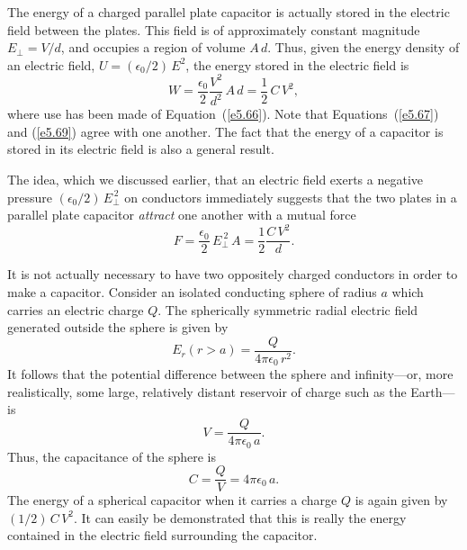 The energy of
a charged parallel
plate
capacitor is actually stored in the electric field between the plates. This field
is of approximately constant magnitude $E_\perp = V/d$, and occupies a
region of volume $A\,d$. Thus, given the energy density of an electric
field, $U = (\epsilon_0/2)\,E^{2}$, the energy stored in the 
electric field is 
\begin{equation}\label{e5.69}
W = \frac{\epsilon_0}{2} \frac{V^2}{d^2}\, A \,d= \frac{1}{2}\, C\, V^2,
\end{equation}
where use has been made of Equation~(\ref{e5.66}). 
Note that Equations~(\ref{e5.67}) and (\ref{e5.69}) agree with one another. The
fact that the energy of a capacitor is stored in its electric field is also
a general result.

The idea, which we discussed earlier, that an electric field exerts a negative
pressure $(\epsilon_0/2)\,E_\perp^{\,2}$ on conductors immediately suggests that
the two plates in a parallel plate capacitor {\em attract}\/ one another with a
mutual force
\begin{equation}\label{eforcc}
F = \frac{\epsilon_0}{2}\, E_\perp^{~2}\,A= \frac{1}{2} \frac{C\, V^2}{d}.
\end{equation}

It is not actually necessary to have two oppositely charged conductors 
in order to make a capacitor.
Consider an isolated
 conducting sphere of radius $a$ which
carries an electric charge $Q$. The spherically symmetric radial electric field generated outside the sphere is
given by
\begin{equation}\label{e5.71}
E_r(r>a) = \frac{Q}{4\pi\epsilon_0 \,r^2}.
\end{equation}
It follows that the potential difference between the sphere and infinity---or, more realistically,
some large, relatively distant reservoir of charge such as the Earth---is
\begin{equation}\label{e5.72}
V = \frac{Q}{4\pi\epsilon_0 \,a}.
\end{equation}
Thus, the capacitance of the sphere is
\begin{equation}
C = \frac{Q}{V} = 4\pi\epsilon_0\, a.
\end{equation}
The energy of a spherical capacitor when it carries a charge $Q$ is again given by
$(1/2)\, C\,V^2$. It can easily be demonstrated that this is really 
the energy contained in the electric field surrounding the capacitor.


